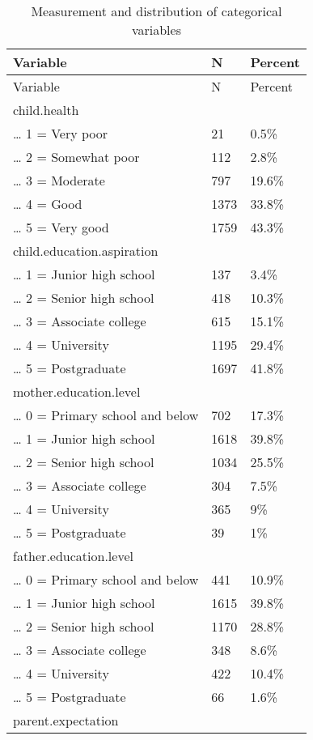 \documentclass[
  man,floatsintext]{apa7}
\begin{document}
\newpage

\begin{longtable}[]{@{}lll@{}}
\caption{\label{tab:tab-ctvar-msr}Measurement and distribution of categorical variables}\tabularnewline
\toprule()
Variable & N & Percent \\
\midrule()
\endfirsthead
\toprule()
Variable & N & Percent \\
\midrule()
\endhead
child.health & & \\
\ldots{} 1 = Very poor & 21 & 0.5\% \\
\ldots{} 2 = Somewhat poor & 112 & 2.8\% \\
\ldots{} 3 = Moderate & 797 & 19.6\% \\
\ldots{} 4 = Good & 1373 & 33.8\% \\
\ldots{} 5 = Very good & 1759 & 43.3\% \\
child.education.aspiration & & \\
\ldots{} 1 = Junior high school & 137 & 3.4\% \\
\ldots{} 2 = Senior high school & 418 & 10.3\% \\
\ldots{} 3 = Associate college & 615 & 15.1\% \\
\ldots{} 4 = University & 1195 & 29.4\% \\
\ldots{} 5 = Postgraduate & 1697 & 41.8\% \\
mother.education.level & & \\
\ldots{} 0 = Primary school and below & 702 & 17.3\% \\
\ldots{} 1 = Junior high school & 1618 & 39.8\% \\
\ldots{} 2 = Senior high school & 1034 & 25.5\% \\
\ldots{} 3 = Associate college & 304 & 7.5\% \\
\ldots{} 4 = University & 365 & 9\% \\
\ldots{} 5 = Postgraduate & 39 & 1\% \\
father.education.level & & \\
\ldots{} 0 = Primary school and below & 441 & 10.9\% \\
\ldots{} 1 = Junior high school & 1615 & 39.8\% \\
\ldots{} 2 = Senior high school & 1170 & 28.8\% \\
\ldots{} 3 = Associate college & 348 & 8.6\% \\
\ldots{} 4 = University & 422 & 10.4\% \\
\ldots{} 5 = Postgraduate & 66 & 1.6\% \\
parent.expectation & & \\

\end{longtable}
\end{document}
